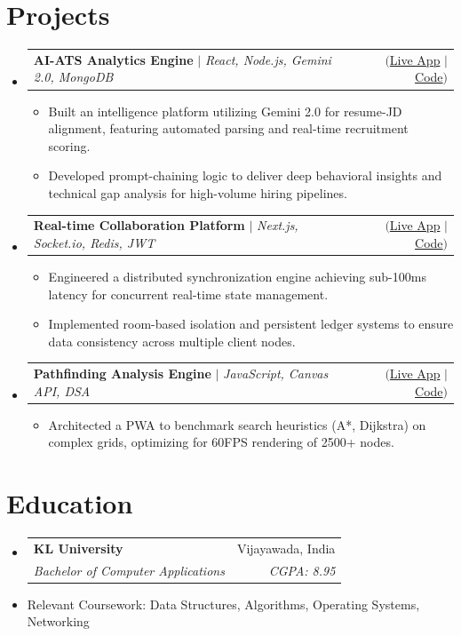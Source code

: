 \documentclass[letterpaper,11pt]{article}
\makeatletter
\newcommand{\resumeItem}[1]{
  \item\small{
    {#1 \vspace{-2pt}}
  }
}
\newcommand{\resumeSubheading}[4]{
  \vspace{-2pt}\item
    \begin{tabular*}{0.97\textwidth}[t]{l@{\extracolsep{\fill}}r}
      \textbf{#1} & #2 \\
      \textit{\small#3} & \textit{\small #4} \\
    \end{tabular*}\vspace{-7pt}
}
\newcommand{\resumeProjectHeading}[2]{
    \item
    \begin{tabular*}{0.97\textwidth}{l@{\extracolsep{\fill}}r}
      \small#1 & #2 \\
    \end{tabular*}\vspace{-7pt}
}
\newcommand{\resumeSubHeadingListStart}{\begin{itemize}[leftmargin=0.15in, label={}]}
\newcommand{\resumeSubHeadingListEnd}{\end{itemize}}
\newcommand{\resumeItemListStart}{\begin{itemize}}
\newcommand{\resumeItemListEnd}{\end{itemize}\vspace{-5pt}}
\makeatother
\begin{document}
\section{Projects}
    \resumeSubHeadingListStart
      \resumeProjectHeading
          {\textbf{AI-ATS Analytics Engine} $|$ \emph{React, Node.js, Gemini 2.0, MongoDB}}{$(${\href{https://ats.yeshwanth.online}{Live App}} $|$ {\href{https:github.com/yeshwanth-kr/ai-ats-engine}{Code}}$)$}
          \resumeItemListStart
            \resumeItem{Built an intelligence platform utilizing Gemini 2.0 for resume-JD alignment, featuring automated parsing and real-time recruitment scoring.}
            \resumeItem{Developed prompt-chaining logic to deliver deep behavioral insights and technical gap analysis for high-volume hiring pipelines.}
          \resumeItemListEnd
      \resumeProjectHeading
          {\textbf{Real-time Collaboration Platform} $|$ \emph{Next.js, Socket.io, Redis, JWT}}{$(${\href{https://wishlist.yeshwanth.online}{Live App}} $|$ {\href{https://github.com/Yeshwanth-kr/realtime-collab-platform}{Code}}$)$}
          \resumeItemListStart
            \resumeItem{Engineered a distributed synchronization engine achieving sub-100ms latency for concurrent real-time state management.}
            \resumeItem{Implemented room-based isolation and persistent ledger systems to ensure data consistency across multiple client nodes.}
          \resumeItemListEnd
      \resumeProjectHeading
          {\textbf{Pathfinding Analysis Engine} $|$ \emph{JavaScript, Canvas API, DSA}}{$(${\href{https://visualize.yeshwanth.online}{Live App}} $|$ {\href{https://github.com/Yeshwanth-kr/pathfinding-visualizer-pwa}{Code}}$)$}
          \resumeItemListStart
            \resumeItem{Architected a PWA to benchmark search heuristics (A*, Dijkstra) on complex grids, optimizing for 60FPS rendering of 2500+ nodes.}
          \resumeItemListEnd
    \resumeSubHeadingListEnd


\section{Education}
  \resumeSubHeadingListStart
    \resumeSubheading
      {KL University}{Vijayawada, India}
      {Bachelor of Computer Applications}{CGPA: 8.95}
      \resumeItem{Relevant Coursework: Data Structures, Algorithms, Operating Systems, Networking}
  \resumeSubHeadingListEnd


\end{document}
